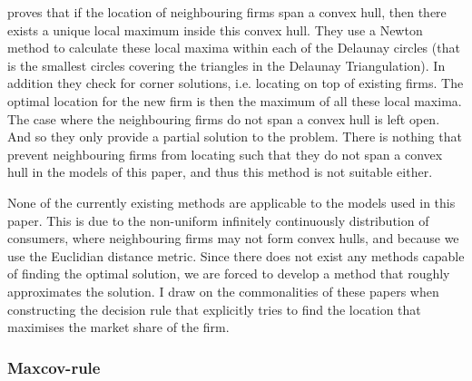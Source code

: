 \documentclass[preprint, 12pt]{elsarticle}
\begin{document}
\citet{Dehne_Klein_Seidel_2002} proves that if the location of neighbouring firms span a convex hull, then there exists a unique local maximum inside this convex hull. They use a Newton method to calculate these local maxima within each of the Delaunay circles (that is the smallest circles covering the triangles in the Delaunay Triangulation). In addition they check for corner solutions, i.e. locating on top of existing firms. The optimal location for the new firm is then the maximum of all these local maxima. The case where the neighbouring firms do not span a convex hull is left open. And so they only provide a partial solution to the problem. There is nothing that prevent neighbouring firms from locating such that they do not span a convex hull in the models of this paper, and thus this method is not suitable either. 

None of the currently existing methods are applicable to the models used in this paper. This is due to the non-uniform infinitely continuously distribution of consumers, where neighbouring firms may not form convex hulls, and because we use the Euclidian distance metric. Since there does not exist any methods capable of finding the optimal solution, we are forced to develop a method that roughly approximates the solution. I draw on the commonalities of these papers when constructing the decision rule that explicitly tries to find the location that maximises the market share of the firm.

\subsubsection{Maxcov-rule}
\end{document}
